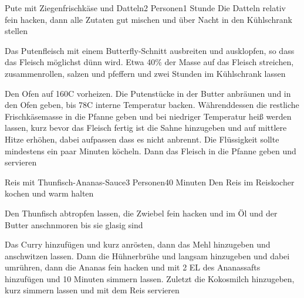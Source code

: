 
\begin{recipe}{Pute mit Ziegenfrischkäse und Datteln}{2 Personen}{1 Stunde}
Die Datteln relativ fein hacken, dann alle Zutaten gut mischen und über Nacht in den Kühlschrank stellen

Das Putenfleisch mit einem Butterfly-Schnitt ausbreiten und ausklopfen, so dass das Fleisch möglichst dünn wird. Etwa 40\% der Masse auf das Fleisch streichen, zusammenrollen, salzen und pfeffern und zwei Stunden im Kühlschrank lassen

Den Ofen auf 160\0C vorheizen. Die Putenstücke in der Butter anbräunen und in den Ofen geben, bis 78\0C interne Temperatur backen. Währenddessen die restliche Frischkäsemasse in die Pfanne geben und bei niedriger Temperatur heiß werden lassen, kurz bevor das Fleisch fertig ist die Sahne hinzugeben und auf mittlere Hitze erhöhen, dabei aufpassen dass es nicht anbrennt. Die Flüssigkeit sollte mindestens ein paar Minuten köcheln. Dann das Fleisch in die Pfanne geben und servieren

\end{recipe}


\begin{recipe}{Reis mit Thunfisch-Ananas-Sauce}{3 Personen}{40  Minuten}
Den Reis im Reiskocher kochen und warm halten

Den Thunfisch abtropfen lassen, die Zwiebel fein hacken und im Öl und der Butter anschnmoren bis sie glasig sind

Das Curry hinzufügen und kurz anrösten, dann das Mehl hinzugeben und anschwitzen lassen. Dann die Hühnerbrühe und  langsam hinzugeben und dabei umrühren, dann die Ananas fein hacken und mit 2 EL des Ananassafts hinzufügen und 10 Minuten simmern lassen. Zuletzt die Kokosmilch hinzugeben, kurz simmern lassen und mit dem Reis servieren
\end{recipe} 


